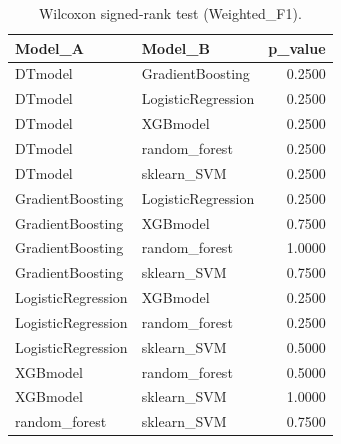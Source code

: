 \begin{table}[t]
\centering
\begin{tabular}{llr}
\toprule
Model_A & Model_B & p_value \\
\midrule
DTmodel & GradientBoosting & 0.2500 \\
DTmodel & LogisticRegression & 0.2500 \\
DTmodel & XGBmodel & 0.2500 \\
DTmodel & random_forest & 0.2500 \\
DTmodel & sklearn_SVM & 0.2500 \\
GradientBoosting & LogisticRegression & 0.2500 \\
GradientBoosting & XGBmodel & 0.7500 \\
GradientBoosting & random_forest & 1.0000 \\
GradientBoosting & sklearn_SVM & 0.7500 \\
LogisticRegression & XGBmodel & 0.2500 \\
LogisticRegression & random_forest & 0.2500 \\
LogisticRegression & sklearn_SVM & 0.5000 \\
XGBmodel & random_forest & 0.5000 \\
XGBmodel & sklearn_SVM & 1.0000 \\
random_forest & sklearn_SVM & 0.7500 \\
\bottomrule
\end{tabular}
\caption{Wilcoxon signed-rank test (Weighted_F1).}
\label{tab:wilcoxon_Weighted_F1}
\end{table}